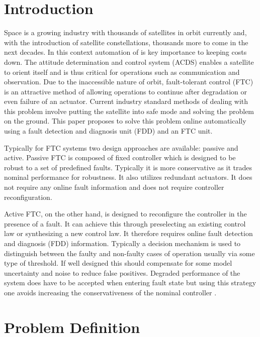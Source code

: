 \section{Introduction}

Space is a growing industry with thousands of satellites in orbit currently and, with the introduction of satellite constellations, thousands more to come in the next decades. In this context automation of is key importance to keeping costs down. The attitude determination and control system (ACDS) enables a satellite to orient itself and is thus critical for operations such as communication and observation. Due to the inaccessible nature of orbit, fault-tolerant control (FTC) is an attractive method of allowing operations to continue after degradation or even failure of an actuator. Current industry standard methods of dealing with this problem involve putting the satellite into safe mode and solving the problem on the ground. This paper proposes to solve this problem online automatically using a fault detection and diagnosis unit (FDD) and an FTC unit.

Typically for FTC systems two design approaches are available: passive and active. Passive FTC is composed of fixed controller which is designed to be robust to a set of predefined faults. Typically it is more conservative as it trades nominal performance for robustness. It also utilizes redundant actuators. It does not require any online fault information and does not require controller reconfiguration. 
\par Active FTC, on the other hand, is designed to reconfigure the controller in the presence of a fault. It can achieve this through preselecting an existing control law or synthesizing a new control law. It therefore requires online fault detection and diagnosis (FDD) information. Typically a decision mechanism is used to distinguish between the faulty and non-faulty cases of operation usually via some type of threshold. If well designed this should compensate for some model uncertainty and noise to reduce false positives. Degraded performance of the system does have to be accepted when entering fault state but using this strategy one avoids increasing the conservativeness of the nominal controller \cite{yinReviewRecentDevelopment2016}.

\section{Problem Definition}

